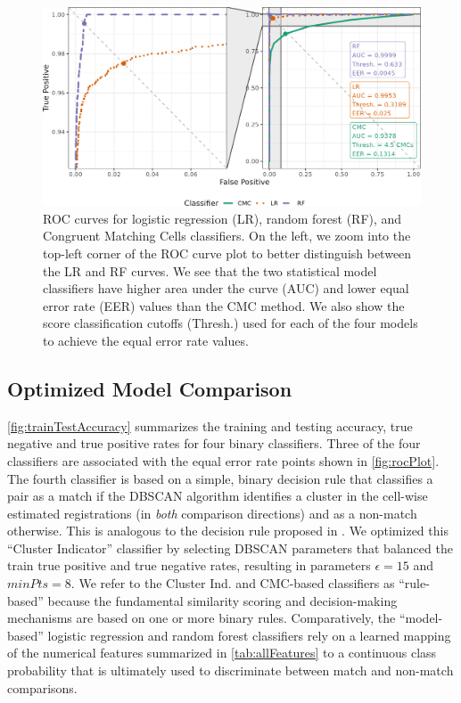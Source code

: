 \documentclass[reprint]{JASA}
\begin{document}
\begin{figure}[htbp]

{\centering \includegraphics[width=\textwidth]{images/resultsPlots/rocPlot} 

}

\caption{ROC curves for logistic regression (LR), random forest (RF), and Congruent Matching Cells classifiers. On the left, we zoom into the top-left corner of the ROC curve plot to better distinguish between the LR and RF curves. We see that the two statistical model classifiers have higher area under the curve (AUC) and lower equal error rate (EER) values than the CMC method. We also show the score classification cutoffs (Thresh.) used for each of the four models to achieve the equal error rate values.}\label{fig:rocPlot}
\end{figure}

\hypertarget{optimized-model-comparison}{%
\subsection{Optimized Model
Comparison}\label{optimized-model-comparison}}

\autoref{fig:trainTestAccuracy} summarizes the training and testing
accuracy, true negative and true positive rates for four binary
classifiers. Three of the four classifiers are associated with the equal
error rate points shown in \autoref{fig:rocPlot}. The fourth classifier
is based on a simple, binary decision rule that classifies a pair as a
match if the DBSCAN algorithm identifies a cluster in the cell-wise
estimated registrations (in \emph{both} comparison directions) and as a
non-match otherwise. This is analogous to the decision rule proposed in
\citet{zhang_convergence_2021}. We optimized this ``Cluster Indicator''
classifier by selecting DBSCAN parameters that balanced the train true
positive and true negative rates, resulting in parameters
\(\epsilon = 15\) and \(minPts = 8\). We refer to the Cluster Ind. and
CMC-based classifiers as ``rule-based'' because the fundamental
similarity scoring and decision-making mechanisms are based on one or
more binary rules. Comparatively, the ``model-based'' logistic
regression and random forest classifiers rely on a learned mapping of
the numerical features summarized in \autoref{tab:allFeatures} to a
continuous class probability that is ultimately used to discriminate
between match and non-match comparisons.
\end{document}
